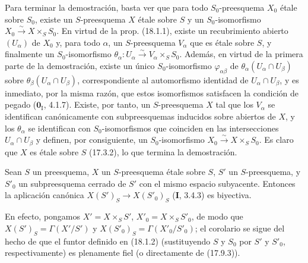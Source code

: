 Para terminar la demostración, basta ver que para todo $S_0$-preesquema $X_0$ étale sobre $S_0$, existe un $S$-preesquema $X$ étale sobre $S$ y un $S_0$-isomorfismo $X_0\xrightarrow{\sim}X\times_S S_0$. En virtud de la prop. (18.1.1), existe un recubrimiento abierto $(U_\alpha)$ de $X_0$ y, para todo $\alpha$, un $S$-preesquema $V_\alpha$ que es étale sobre $S$, y finalmente un $S_0$-isomorfismo $\theta_\alpha:U_\alpha\xrightarrow{\sim}V_\alpha\times_S S_0$. Además, en virtud de la primera parte de la demostración, existe un único $S_0$-isomorfismo $\varphi_{\alpha\beta}$ de $\theta_\alpha(U_\alpha\cap U_\beta)$ sobre $\theta_\beta(U_\alpha\cap U_\beta)$, correspondiente al automorfismo identidad de $U_\alpha\cap U_\beta$, y es inmediato, por la misma razón, que estos isomorfismos satisfacen la condición de pegado ($\mathbf{0}_{\mathrm I}$, 4.1.7). Existe, por tanto, un $S$-preesquema $X$ tal que los $V_\alpha$ se identifican canónicamente con subpreesquemas inducidos sobre abiertos de $X$, y los $\theta_\alpha$ se identifican con $S_0$-isomorfismos que coinciden en las intersecciones $U_\alpha\cap U_\beta$ y definen, por consiguiente, un $S_0$-isomorfismo $X_0\xrightarrow{\sim}X\times_S S_0$. Es claro que $X$ es étale sobre $S$ (17.3.2), lo que termina la demostración.

\begin{corollary}[18.1.3]
\label{IV.18.1.3}
Sean $S$ un preesquema, $X$ un $S$-preesquema étale sobre $S$, $S'$ un $S$-preesquema, y $S'_0$ un subpreesquema cerrado de $S'$ con el mismo espacio subyacente. Entonces la aplicación canónica $X(S')_S\to X(S'_0)_S$ \textup{(\textbf I, 3.4.3)} es biyectiva.
\end{corollary}

En efecto, pongamos $X'=X\times_S S'$, $X'_0=X\times_S S'_0$, de modo que $X(S')_S=\Gamma(X'/S')$ y $X(S'_0)_S=\Gamma(X'_0/S'_0)$; el corolario se sigue del hecho de que el funtor definido en (18.1.2) (sustituyendo $S$ y $S_0$ por $S'$ y $S'_0$, respectivamente) es plenamente fiel (o directamente de (17.9.3)).
